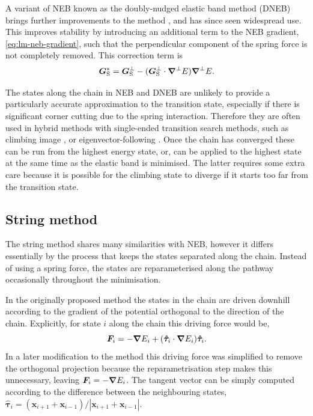A variant of NEB known as the doubly-nudged elastic band method (DNEB) brings further improvements to the method \cite{Trygubenko2004}, and has since seen widespread use.
This improves stability by introducing an additional term to the NEB gradient, \cref{eq:lm-neb-gradient}, such that the perpendicular component of the spring force is not completely removed.
This correction term is
\begin{equation}
  \bm{G}_\text{S}^* = \bm{G}_\text{S}^\perp - (\bm{G}_\text{S}^\perp \cdot \bm{\nabla}^\perp E) \bm{\nabla}^\perp E.
\end{equation}

The states along the chain in NEB and DNEB are unlikely to provide a particularly accurate approximation to the transition state, especially if there is significant corner cutting due to the spring interaction.
Therefore they are often used in hybrid methods with single-ended transition search methods, such as climbing image \cite{Henkelman2000a}, or eigenvector-following \cite{Trygubenko2004}.
Once the chain has converged these can be run from the highest energy state, or, can be applied to the highest state at the same time as the elastic band is minimised.
The latter requires some extra care because it is possible for the climbing state to diverge if it starts too far from the transition state.


\subsection{String method}\label{sec:lm-string}
The string method \cite{E2002,E2007} shares many similarities with NEB, however it differs essentially by the process that keeps the states separated along the chain.
Instead of using a spring force, the states are reparameterised along the pathway occasionally throughout the minimisation.

In the originally proposed method \cite{E2002} the states in the chain are driven downhill according to the gradient of the potential orthogonal to the direction of the chain.
Explicitly, for state $i$ along the chain this driving force would be,
\begin{equation}
  \bm{F}_i = - \bm{\nabla} E_i + (\bm{\hat{\tau}}_i \cdot \bm{\nabla} E_i) \bm{\hat{\tau}}_i.
\end{equation}
In a later modification to the method \cite{E2007} this driving force was simplified to remove the orthogonal projection because the reparametrisation step makes this unnecessary, leaving $\bm{F}_i = - \bm{\nabla} E_i$.
The tangent vector can be simply computed according to the difference between the neighbouring states, $\bm{\hat{\tau}}_i = (\bm{x}_{i+1} + \bm{x}_{i-1}) / |\bm{x}_{i+1} + \bm{x}_{i-1}|$.

